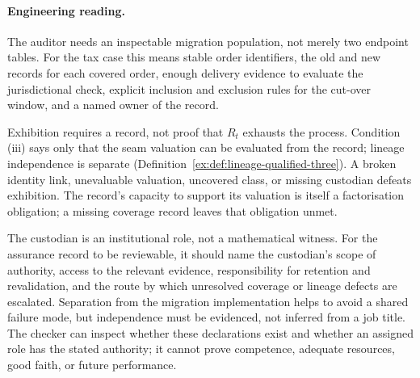 \documentclass[twocolumn,envcountsect,envcountsame,natbib]{svjour3}
\begin{document}
\paragraph{Engineering reading.} The auditor needs an inspectable migration population, not merely two endpoint tables. For the tax case this means stable order identifiers, the old and new records for each covered order, enough delivery evidence to evaluate the jurisdictional check, explicit inclusion and exclusion rules for the cut-over window, and a named owner of the record.

Exhibition requires a record, not proof that $R_t$ exhausts the process. Condition (iii) says only that the seam valuation can be evaluated from the record; lineage independence is separate (Definition~\ref{ex:def:lineage-qualified-three}). A broken identity link, unevaluable valuation, uncovered class, or missing custodian defeats exhibition. The record's capacity to support its valuation is itself a factorisation obligation; a missing coverage record leaves that obligation unmet.

The custodian is an institutional role, not a mathematical witness. For the assurance record to be reviewable, it should name the custodian's scope of authority, access to the relevant evidence, responsibility for retention and revalidation, and the route by which unresolved coverage or lineage defects are escalated. Separation from the migration implementation helps to avoid a shared failure mode, but independence must be evidenced, not inferred from a job title. The checker can inspect whether these declarations exist and whether an assigned role has the stated authority; it cannot prove competence, adequate resources, good faith, or future performance.
\end{document}
